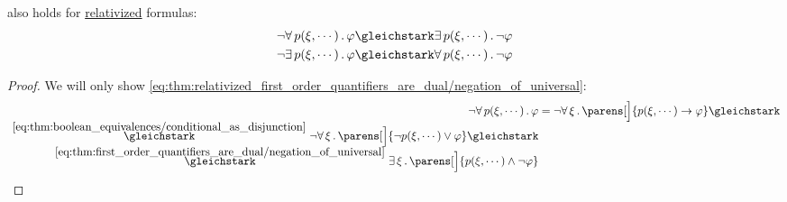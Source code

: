 \begin{corollary}\label{thm:relativized_first_order_quantifiers_are_dual}
   also holds for \hyperref[rem:first_order_formula_conventions/relativization]{relativized} formulas:
  \begin{align}
    \neg \qforall {p(\xi, \cdots)} \varphi &\gleichstark \qexists {p(\xi, \cdots)} \neg \varphi \label{eq:thm:relativized_first_order_quantifiers_are_dual/negation_of_universal} \\
    \neg \qexists {p(\xi, \cdots)} \varphi &\gleichstark \qforall {p(\xi, \cdots)} \neg \varphi \label{eq:thm:relativized_first_order_quantifiers_are_dual/negation_of_existential}
  \end{align}
\end{corollary}
\begin{proof}
  We will only show \eqref{eq:thm:relativized_first_order_quantifiers_are_dual/negation_of_universal}:
  \begin{align*}
    \neg \qforall {p(\xi, \cdots)} \varphi
    &=
    \neg \qforall \xi \parens[\Big]{ p(\xi, \cdots) \rightarrow \varphi }
    \gleichstark \\ \reloset {\eqref{eq:thm:boolean_equivalences/conditional_as_disjunction}} \gleichstark
    \neg \qforall \xi \parens[\Big]{ \neg p(\xi, \cdots) \vee \varphi }
    \gleichstark \\ \reloset {\eqref{eq:thm:first_order_quantifiers_are_dual/negation_of_universal}} \gleichstark
    \qexists \xi \parens[\Big]{ p(\xi, \cdots) \wedge \neg \varphi }
  \end{align*}
\end{proof}

